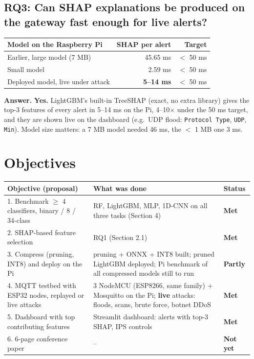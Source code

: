 \documentclass[11pt,a4paper]{article}
\newcommand{\file}[1]{\texttt{\small #1}}
\newcommand{\MET}{\textcolor{ok}{\textbf{Met}}}
\newcommand{\PART}{\textcolor{part}{\textbf{Partly}}}
\newcommand{\NOT}{\textcolor{no}{\textbf{Not yet}}}
\newcommand{\dep}{\rowcolor{gray!18}}
\newcommand{\answer}[1]{\par\noindent\colorbox{accent!8}{\parbox{\dimexpr\linewidth-2\fboxsep}{\vspace{0.4em}\textbf{Answer.} #1\vspace{0.4em}}}\par}
\begin{document}
\subsection{RQ3: Can SHAP explanations be produced on the gateway fast enough for live alerts?}

\begin{center}
\begin{tabular}{lrr}
\toprule
Model on the Raspberry Pi & SHAP per alert & Target \\
\midrule
Earlier, large model (7 MB) & 45.65 ms & $<$ 50 ms \\
Small model & 2.59 ms & $<$ 50 ms \\
\dep Deployed model, live under attack & \textbf{5--14 ms} & $<$ 50 ms \\
\bottomrule
\end{tabular}
\end{center}

\answer{\textbf{Yes.} LightGBM's built-in TreeSHAP (exact, no extra library) gives the top-3 features of every
alert in 5--14 ms on the Pi, 4--10$\times$ under the 50 ms target, and they are shown live on the dashboard
(e.g.\ UDP flood: \file{Protocol Type}, \file{UDP}, \file{Min}). Model size matters: a 7 MB model needed 46 ms,
the $<$ 1 MB one 3 ms.}

\section{Objectives}

\begin{longtable}{P{5.2cm}P{8.0cm}P{1.6cm}}
\toprule
Objective (proposal) & What was done & Status \\
\midrule
{}. Benchmark $\geq$ 4 classifiers, binary / 8 / 34-class & RF, LightGBM, MLP, 1D-CNN on all three tasks (Section 4) & \MET \\
2. SHAP-based feature selection & RQ1 (Section 2.1) & \MET \\
3. Compress (pruning, INT8) and deploy on the Pi & pruning + ONNX + INT8 built; pruned LightGBM deployed; Pi
benchmark of all compressed models still to run & \PART \\
4. MQTT testbed with ESP32 nodes, replayed or live attacks & 3 NodeMCU (ESP8266, same family) + Mosquitto on the
Pi; \textbf{live} attacks: floods, scans, brute force, botnet DDoS & \MET \\
5. Dashboard with top contributing features & Streamlit dashboard: alerts with top-3 SHAP, IPS controls & \MET \\
6. 6-page conference paper & -- & \NOT \\
\bottomrule
\end{longtable}
\end{document}
